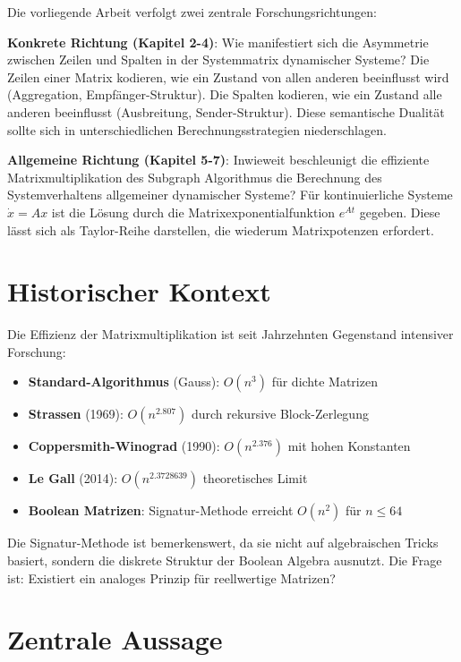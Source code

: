 ﻿\documentclass[a4paper,12pt]{report}
\theoremstyle{definition}
\begin{document}
	Die vorliegende Arbeit verfolgt zwei zentrale Forschungsrichtungen:
	
	\textbf{Konkrete Richtung (Kapitel 2-4)}: Wie manifestiert sich die Asymmetrie zwischen Zeilen und Spalten in der Systemmatrix dynamischer Systeme? Die Zeilen einer Matrix kodieren, wie ein Zustand von allen anderen beeinflusst wird (Aggregation, Empfänger-Struktur). Die Spalten kodieren, wie ein Zustand alle anderen beeinflusst (Ausbreitung, Sender-Struktur). Diese semantische Dualität sollte sich in unterschiedlichen Berechnungsstrategien niederschlagen.
	
	\textbf{Allgemeine Richtung (Kapitel 5-7)}: Inwieweit beschleunigt die effiziente Matrixmultiplikation des Subgraph Algorithmus die Berechnung des Systemverhaltens allgemeiner dynamischer Systeme? Für kontinuierliche Systeme $\dot{x} = Ax$ ist die Lösung durch die Matrixexponentialfunktion $e^{At}$ gegeben. Diese lässt sich als Taylor-Reihe darstellen, die wiederum Matrixpotenzen erfordert.
	
	\section{Historischer Kontext}
	
	Die Effizienz der Matrixmultiplikation ist seit Jahrzehnten Gegenstand intensiver Forschung:
	
	\begin{itemize}
		\item \textbf{Standard-Algorithmus} (Gauss): $O(n^3)$ für dichte Matrizen
		\item \textbf{Strassen} (1969): $O(n^{2.807})$ durch rekursive Block-Zerlegung
		\item \textbf{Coppersmith-Winograd} (1990): $O(n^{2.376})$ mit hohen Konstanten
		\item \textbf{Le Gall} (2014): $O(n^{2.3728639})$ theoretisches Limit
		\item \textbf{Boolean Matrizen}: Signatur-Methode erreicht $O(n^2)$ für $n \leq 64$
	\end{itemize}
	
	Die Signatur-Methode ist bemerkenswert, da sie nicht auf algebraischen Tricks basiert, sondern die diskrete Struktur der Boolean Algebra ausnutzt. Die Frage ist: Existiert ein analoges Prinzip für reellwertige Matrizen?
	
	\section{Zentrale Aussage}
	
\end{document}
